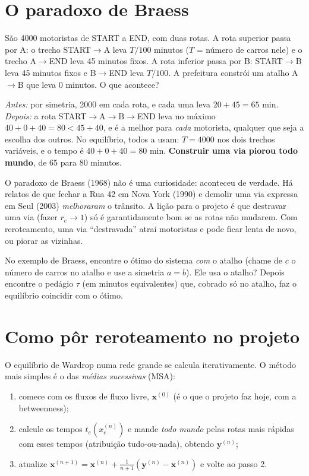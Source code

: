\documentclass[11pt]{article}
\begin{document}
\section{O paradoxo de Braess}

\begin{exemplo}
São 4000 motoristas de START a END, com duas rotas. A rota superior passa por A: o trecho START$\to$A leva $T/100$ minutos ($T$ = número de carros nele) e o trecho A$\to$END leva 45 minutos fixos. A rota inferior passa por B: START$\to$B leva 45 minutos fixos e B$\to$END leva $T/100$. A prefeitura constrói um atalho A$\to$B que leva 0 minutos. O que acontece?
\end{exemplo}
\begin{solucao}
\emph{Antes:} por simetria, 2000 em cada rota, e cada uma leva $20+45 = 65$ min. \emph{Depois:} a rota START$\to$A$\to$B$\to$END leva no máximo $40+0+40 = 80 < 45+40$, e é a melhor para \emph{cada} motorista, qualquer que seja a escolha dos outros. No equilíbrio, todos a usam: $T = 4000$ nos dois trechos variáveis, e o tempo é $40+0+40 = 80$ min. \textbf{Construir uma via piorou todo mundo}, de 65 para 80 minutos.
\end{solucao}

\begin{ideia}
O paradoxo de Braess (1968) não é uma curiosidade: aconteceu de verdade. Há relatos de que fechar a Rua 42 em Nova York (1990) e demolir uma via expressa em Seul (2003) \emph{melhoraram} o trânsito. A lição para o projeto é que destravar uma via (fazer $r_e\to1$) só é garantidamente bom se as rotas não mudarem. Com reroteamento, uma via ``destravada'' atrai motoristas e pode ficar lenta de novo, ou piorar as vizinhas.
\end{ideia}

 No exemplo de Braess, encontre o ótimo do sistema \emph{com} o atalho (chame de $c$ o número de carros no atalho e use a simetria $a=b$). Ele usa o atalho? Depois encontre o pedágio $\tau$ (em minutos equivalentes) que, cobrado só no atalho, faz o equilíbrio coincidir com o ótimo.

\section{Como pôr reroteamento no projeto}

O equilíbrio de Wardrop numa rede grande se calcula iterativamente. O método mais simples é o das \emph{médias sucessivas} (MSA):
\begin{enumerate}
  \item comece com os fluxos de fluxo livre, $\bm x^{(0)}$ (é o que o projeto faz hoje, com a betweenness);
  \item calcule os tempos $t_e(x_e^{(n)})$ e mande \emph{todo mundo} pelas rotas mais rápidas com esses tempos (atribuição tudo-ou-nada), obtendo $\bm y^{(n)}$;
  \item atualize $\bm x^{(n+1)} = \bm x^{(n)}+\frac{1}{n+1}\left(\bm y^{(n)}-\bm x^{(n)}\right)$ e volte ao passo 2.
\end{enumerate}
\end{document}
